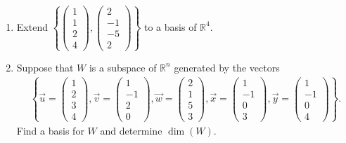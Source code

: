 \documentclass[a4paper,11pt]{article}
\begin{document}
\begin{enumerate}[label=5.\arabic*]
    \item Extend $\left\{ \begin{pmatrix} 1 \\ 1 \\ 2 \\ 4 \end{pmatrix}, \begin{pmatrix} 2 \\ -1 \\ -5 \\ 2 \end{pmatrix} \right\}$ to a basis of $\mathbb{R}^4$.
    
    \item Suppose that $W$ is a subspace of $\mathbb{R}^n$ generated by the vectors
    \begin{align*}
        \left\{ \vec{u} = \begin{pmatrix} 1 \\ 2 \\ 3 \\ 4 \end{pmatrix}, 
        \vec{v} = \begin{pmatrix} 1 \\ -1 \\ 2 \\ 0 \end{pmatrix}, 
        \vec{w} = \begin{pmatrix} 2 \\ 1 \\ 5 \\ 3 \end{pmatrix}, 
        \vec{x} = \begin{pmatrix} 1 \\ -1 \\ 0 \\ 3 \end{pmatrix}, 
        \vec{y} = \begin{pmatrix} 1 \\ -1 \\ 0 \\ 4 \end{pmatrix} \right\}.
    \end{align*}
    Find a basis for $W$ and determine $\dim(W)$.
\end{enumerate}
\end{document}

